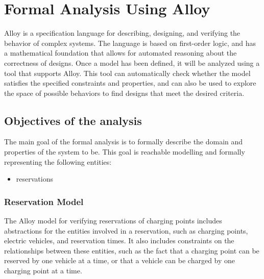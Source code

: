\section{Formal Analysis Using Alloy}
Alloy is a specification language for describing, designing, and verifying the behavior of complex systems.
The language is based on first-order logic, and has a mathematical foundation that allows for automated reasoning
about the correctness of designs.
Once a model has been defined, it will be analyzed using a tool that supports Alloy. This tool can automatically check
whether the model satisfies the specified constraints and properties, and can also be used to explore the space of
possible behaviors to find designs that meet the desired criteria.

\subsection{Objectives of the analysis}
The main goal of the formal analysis is to formally describe the domain and properties of the system to be.
This goal is reachable modelling and formally representing the following entities:
\begin{itemize}
    \item reservations
\end{itemize}

\subsubsection{Reservation Model}
The Alloy model for verifying reservations of charging points includes abstractions
for the entities involved in a reservation, such as charging points, electric vehicles, and reservation times.
It also includes constraints on the relationships between these entities, such as the fact that a charging point
can be reserved by one vehicle at a time, or that a vehicle can be charged by one charging point at a time.

